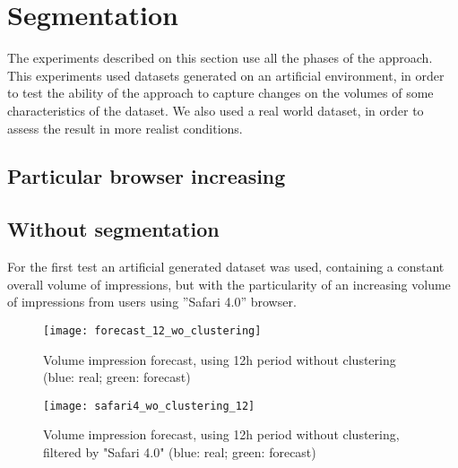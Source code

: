 \section{Segmentation}

The experiments described on this section use all the phases of the approach.
This experiments used datasets generated on an artificial environment, in order to
test the ability of the approach to capture changes on the volumes of some
characteristics of the dataset.
We also used a real world dataset, in order to assess the result in
more realist conditions.

\subsection{Particular browser increasing}

\subsection*{Without segmentation}

For the first test an artificial generated dataset was used, containing a constant overall
volume of impressions, but with the particularity of an increasing volume of
impressions from users using ''Safari 4.0'' browser. 

\begin{figure}[!ht]
\centering
\begin{minipage}[t]{0.45\linewidth}
\texttt{[image: forecast\_12\_wo\_clustering]} \caption[Volume
impression forecast, safari]{Volume impression
forecast, using 12h period without clustering (blue: real; green: forecast)}
\label{fig:vol_safari_12h_wo_clustering}
\end{minipage}
\quad
\begin{minipage}[t]{0.45\linewidth}
\texttt{[image: safari4\_wo\_clustering\_12]} \caption[Volume
impression forecast, safari 4, without segmentation]{Volume impression
forecast, using 12h period without clustering, filtered by "Safari 4.0" (blue: real; green: forecast)}
\label{fig:vol_safari_12h_wo_clustering_safari_4} 
\end{minipage}
\end{figure}



